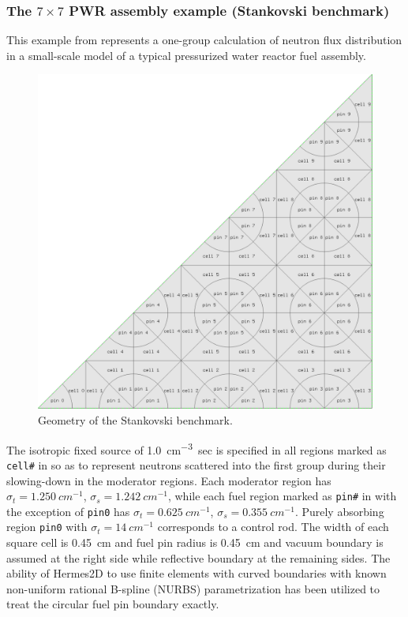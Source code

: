 \subsubsection{The $7\times 7$ PWR assembly example (Stankovski benchmark)}\label{sec:stankovski}

This example from \cite[Sec. 6.4.2]{dragon} represents a one-group calculation of neutron flux distribution in a
small-scale model of a typical pressurized water reactor fuel assembly.
\begin{figure}[!ht]
\centering
  \includegraphics[width=.5\textwidth]{stankov/meshh}
  \caption[Geometry of the Stankovski benchmark]{Geometry of the Stankovski benchmark.}
  \label{fig:30}
\end{figure}
 The isotropic fixed source of
\SI{1.0}{cm^{-3}.sec} is specified in all regions marked as \texttt{cell\#} in  so as to represent neutrons
scattered into the first group during their slowing-down in the moderator regions. Each moderator region has $\sigma_t
= \SI{1.250}{cm^{-1}}$, $\sigma_s = \SI{1.242}{cm^{-1}}$, while each fuel region marked as \texttt{pin\#} in
 with the exception of \texttt{pin0} has $\sigma_t = \SI{0.625}{cm^{-1}}$, $\sigma_s =
\SI{0.355}{cm^{-1}}$. Purely absorbing region \texttt{pin0} with $\sigma_t =
\SI{14}{cm^{-1}}$ corresponds to a control rod. The width of each square cell is \SI{0.45}{cm} and fuel pin radius is
\SI{0.45}{cm} and vacuum boundary is assumed at the right side while reflective boundary at the remaining sides. The
ability of Hermes2D to use finite elements with curved boundaries with known non-uniform rational B-spline (NURBS) parametrization \cite{Hermes-book1} has been utilized to treat the circular fuel pin boundary exactly.
